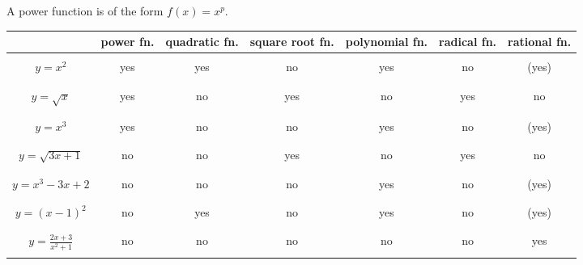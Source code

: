 \documentclass{article}
\begin{document}
A power function is of the form $f(x) = x^p$.\\

\begin{tabular}{| c | c | c | c | c | c | c |}
\hline
 & power fn. & quadratic fn. & square root fn. & polynomial fn. & radical fn. & rational fn. \\
\hline
& & & & & &\\
$y=x^2$ & yes & yes & no & yes & no & (yes) \\
& & & & & &\\
\hline
& & & & & &\\
$y=\sqrt{x}$ & yes & no & yes & no & yes & no\\
& & & & & &\\
\hline
& & & & & &\\
$y=x^3$ & yes & no & no & yes & no & (yes)\\
& & & & & &\\
\hline
& & & & & &\\
$y=\sqrt{3x+1}$ & no & no & yes & no & yes & no\\
& & & & & &\\
\hline 
& & & & & &\\
$y=x^3 - 3x + 2$ & no & no & no & yes & no & (yes)\\
& & & & & &\\
\hline 
& & & & & &\\
$y=(x-1)^2$ & no & yes & no & yes & no & (yes)\\
& & & & & &\\
\hline 
& & & & & &\\
$y=\frac{2x+3}{x^2+1}$ & no & no & no & no & no & yes\\
& & & & & &\\
\hline 
\end{tabular}
\end{document}
